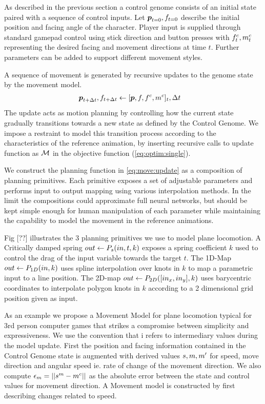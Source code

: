 As described in the previous section a control genome consists of an initial state paired with a sequence of control inputs. Let $\boldsymbol{p }_{t=0},f_{t=0}$ describe the initial position and facing angle of the character. Player input is supplied through standard gamepad control using stick direction and button presses with $f^c_t, m^c_t$ representing the desired facing and movement directions at time $t$. Further parameters can be added to support different movement styles.   

A sequence of movement is generated by recursive updates to the genome state by the movement model.
\begin{align}
    \boldsymbol{p }_{t+\Delta{t}},f_{t+\Delta{t}}&\leftarrow[\boldsymbol{p },f,f^c,m^c]_t,\Delta{t}\label{eq:move:update}
\end{align}
The update  acts as motion planning by controlling how the current state gradually transitions towards a new state as defined by the Control Genome. We impose a restraint to model this transition process according to the characteristics of the reference animation, by inserting recursive calls to update function as $\mathcal{M}$ in the objective function (\ref{eq:optim:single}).

We construct the planning function in \ref{eq:move:update} as a composition of planning primitives. Each primitive exposes a set of adjustable parameters and performs input to output mapping using various interpolation methods. In the limit the compositions could approximate full neural networks, but should be kept simple enough for human manipulation of each parameter while maintaining the capability to model the movement in the reference animations.     

Fig [??] illustrates the 3 planning primitives we use to model plane locomotion. A Critically damped spring $out\leftarrow{}P_s{(in,t,k)}$ exposes a spring coefficient $k$ used to control the drag of the input variable towards the target $t$. The 1D-Map $out\leftarrow{}P_{1D}(in,k)$ uses spline interpolation over knots in $k$ to map a parametric input to a line position. The 2D-map $out\leftarrow{}P_{2D}([in_x, in_y], k)$ uses barycentric coordinates to interpolate polygon knots in $k$ according to a 2 dimensional grid position given as input.    

As an example we propose a Movement Model for plane locomotion typical for 3rd person computer games that strikes a compromise between simplicity and expressiveness. We use the convention that i refers to intermediary values during the model update. First the position and facing information contained in the Control Genome state is augmented with derived values $s, m, {m'}$ for speed, move direction and angular speed ie. rate of change of the movement direction. We also compute $\epsilon_m=||s^m-m^c||$ as the absolute error between the state and control values for movement direction. A Movement model is constructed by first describing changes related to speed.

